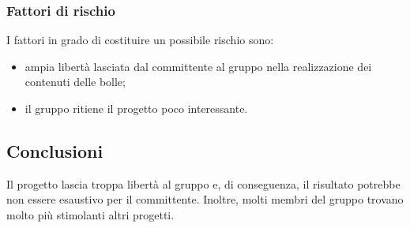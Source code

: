 		\subsubsection {Fattori di rischio}
		I fattori in grado di costituire un possibile rischio sono:
			\begin{itemize}
				\item ampia libertà lasciata dal committente al gruppo nella realizzazione dei contenuti delle bolle;		
				\item il gruppo ritiene il progetto poco interessante.
			\end{itemize}
	\subsection {Conclusioni}
		Il progetto lascia troppa libertà al gruppo e, di conseguenza, il risultato potrebbe non essere esaustivo per il committente. Inoltre, molti membri del gruppo trovano molto più stimolanti altri progetti.
	
